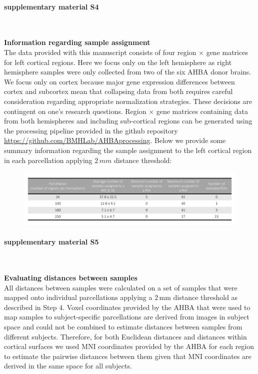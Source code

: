 \documentclass[10pt,A4]{article}
\begin{document}
\paragraph*{supplementary material S4}\mbox{}\\
\label{SItext4}

\textbf{Information regarding sample assignment}\\
The data provided with this manuscript consists of four region $\times$ gene matrices for left cortical regions. Here we focus only on the left hemisphere as right hemisphere samples were only collected from two of the six AHBA donor brains. We focus only on cortex because major gene expression differences between cortex and subcortex mean that collapsing data from both requires careful consideration regarding appropriate normalization strategies. These decisions are contingent on one’s research questions. Region $\times$ gene matrices containing data from both hemispheres and including sub-cortical regions can be generated using the processing pipeline provided in the github repository \url{https://github.com/BMHLab/AHBAprocessing}. Below we provide some summary information regarding the sample assignment to the left cortical region in each parcellation applying $2\,mm$ distance threshold:

\begin{figure}[h!]
  \centering
    \includegraphics[width=1\textwidth]{TableS4.pdf}
\label{TableS4}
\end{figure}

\paragraph*{supplementary material S5}\mbox{}\\
\label{SItext5}

\textbf{Evaluating distances between samples}\\
All distances between samples were calculated on a set of samples that were mapped onto individual parcellations applying a $2\,$mm distance threshold as described in Step $4$. Voxel coordinates provided by the AHBA that were used to map samples to subject-specific parcellations are derived from images in subject space and could not be combined to estimate distances between samples from different subjects. Therefore, for both Euclidean distances and distances within cortical surfaces we used MNI coordinates provided by the AHBA for each region to estimate the pairwise distances between them given that MNI coordinates are derived in the same space for all subjects.
\end{document}
